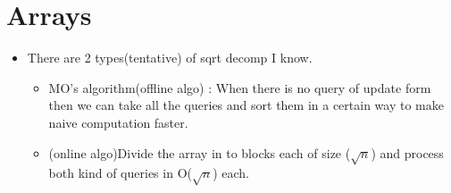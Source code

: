 \documentclass[../Notes.tex]{subfiles}
\begin{document}
\chapter{Arrays}

\begin{itemize}
	\item There are 2 types(tentative) of sqrt decomp I know.
	\begin{itemize}
		\item MO's algorithm(offline algo) : When there is no query of update form then we can take all the queries and sort them in a certain way to make naive computation faster.
		\item (online algo)Divide the array in to blocks each of size ($\sqrt{n}$) and process both kind of queries in O($\sqrt{n}$) each.
	\end{itemize} 
\end{itemize}
\end{document}
